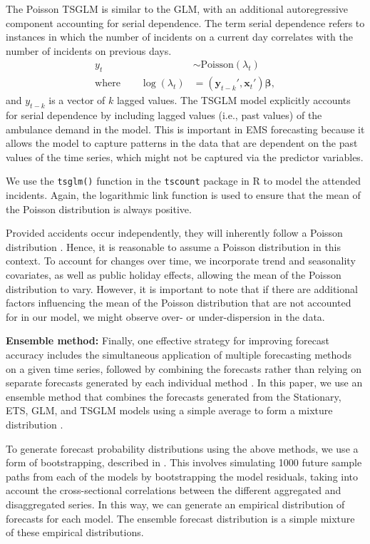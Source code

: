 \documentclass[
  authoryear,
  preprint,
  3p]{elsarticle}
\begin{document}
The Poisson TSGLM is similar to the GLM, with an additional
autoregressive component accounting for serial dependence. The term
serial dependence refers to instances in which the number of incidents
on a current day correlates with the number of incidents on previous
days. \begin{align*}
  y_t &\sim \text{Poisson}(\lambda_t) \\
  \text{where}\qquad
  \log(\lambda_t) &= (\bm{y}_{t-k}' , \bm{x}_t')\bm{\beta},
\end{align*} and \({y}_{t-k}\) is a vector of \(k\) lagged values. The
TSGLM model explicitly accounts for serial dependence by including
lagged values (i.e., past values) of the ambulance demand in the model.
This is important in EMS forecasting because it allows the model to
capture patterns in the data that are dependent on the past values of
the time series, which might not be captured via the predictor
variables.

We use the \texttt{tsglm()} function in the \texttt{tscount} package in
R \citep{JSSv082i05} to model the attended incidents. Again, the
logarithmic link function is used to ensure that the mean of the Poisson
distribution is always positive.

Provided accidents occur independently, they will inherently follow a
Poisson distribution \citep[p156--158]{feller1991introduction}. Hence,
it is reasonable to assume a Poisson distribution in this context. To
account for changes over time, we incorporate trend and seasonality
covariates, as well as public holiday effects, allowing the mean of the
Poisson distribution to vary. However, it is important to note that if
there are additional factors influencing the mean of the Poisson
distribution that are not accounted for in our model, we might observe
over- or under-dispersion in the data.

\textbf{Ensemble method:} Finally, one effective strategy for improving
forecast accuracy includes the simultaneous application of multiple
forecasting methods on a given time series, followed by combining the
forecasts rather than relying on separate forecasts generated by each
individual method \citep{clemen1989combining}. In this paper, we use an
ensemble method that combines the forecasts generated from the
Stationary, ETS, GLM, and TSGLM models using a simple average to form a
mixture distribution \citep{combinations}.

To generate forecast probability distributions using the above methods,
we use a form of bootstrapping, described in
\citet{panagiotelis2023probabilistic}. This involves simulating 1000
future sample paths from each of the models by bootstrapping the model
residuals, taking into account the cross-sectional correlations between
the different aggregated and disaggregated series. In this way, we can
generate an empirical distribution of forecasts for each model. The
ensemble forecast distribution is a simple mixture of these empirical
distributions.
\end{document}
